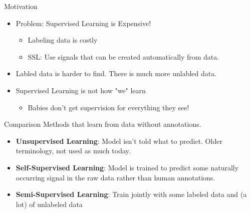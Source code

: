 \documentclass[serif, aspectratio=169]{beamer}
\begin{document}
\begin{frame}[t]{Motivation}
  
    \begin{itemize}
        \item Problem: Supervised Learning is Expensive!
            \begin{itemize}
        \item Labeling data is costly
\item SSL: Use signals that can be created automatically from data.
    \end{itemize}
\item Labled data is harder to find. There is much more unlabled data.
\item Supervised Learning is not how "we" learn
  \begin{itemize}
 \item Babies don’t get supervision for everything they see!

     \end{itemize}

    \end{itemize}

\end{frame}



\begin{frame}[t]{Comparison}
Methods that learn from data without annotations.
    \begin{itemize}
        
\item \textbf{ Unsupervised Learning}: Model isn’t told what to predict. Older 
terminology, not used as much today.
 \item \textbf{ Self-Supervised Learning}: Model is trained to predict some naturally
occurring signal in the raw data rather than human annotations.
 \item \textbf{  Semi-Supervised Learning}: Train jointly with some labeled data and (a lot)
 of unlabeled data
    \end{itemize}
\end{frame}
\end{document}
